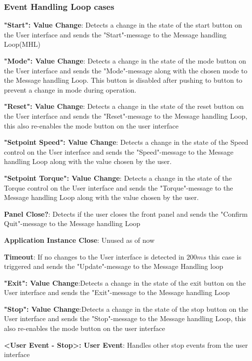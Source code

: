\documentclass{ol-softwaremanual}
\begin{document}
\subsubsection*{Event Handling Loop cases}

\begin{enumerate}[label={[\arabic*]}]
  \item \textbf{"Start": Value Change}: Detects a change in the state of the start button on the User interface and sends the "Start"-message to the Message handling Loop(MHL)
  \item \textbf{"Mode": Value Change}: Detects a change in the state of the mode button on the User interface and sends the "Mode"-message along with the chosen mode to the Message handling Loop. This button is disabled after pushing to button to prevent a change in mode during operation.
  \item \textbf{"Reset": Value Change}: Detects a change in the state of the reset button on the User interface and sends the "Reset"-message to the Message handling Loop, this also re-enables the mode button on the user interface
  \item \textbf{"Setpoint Speed": Value Change}: Detects a change in the state of the Speed control on the User interface and sends the "Speed"-message to the Message handling Loop along with the value chosen by the user. 
  \item \textbf{"Setpoint Torque": Value Change}: Detects a change in the state of the Torque control on the User interface and sends the "Torque"-message to the Message handling Loop along with the value  chosen by the user. 
  \item \textbf{Panel Close?}: Detects if the user closes the front panel and sends the "Confirm Quit"-message to the Message handling Loop
  \item \textbf{Application Instance Close}: Unused as of now
  \item \textbf{Timeout}: If no changes to the User interface is detected in $200ms$ this case is triggered and sends the "Update"-message to the Message Handling loop
   \item \textbf{"Exit": Value Change}:Detects a change in the state of the exit button on the User interface and sends the "Exit"-message to the Message handling Loop
 \item \textbf{"Stop": Value Change}:Detects a change in the state of the stop button on the User interface and sends the "Stop"-message to the Message handling Loop, this also re-enables the mode button on the user interface
 \item \textbf{<User Event - Stop>: User Event}: Handles other stop events from the user interface
\end{enumerate}
\end{document}
